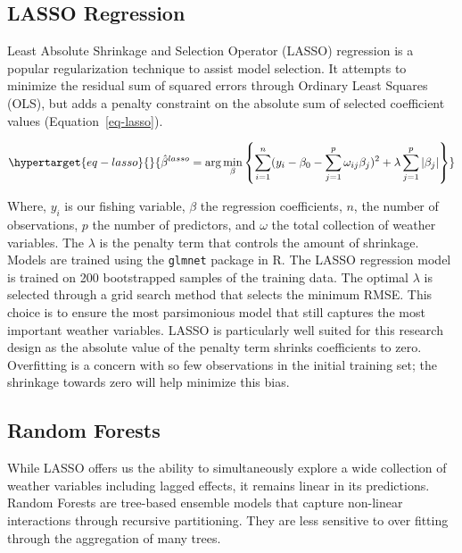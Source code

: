 \documentclass[
  letterpaper,
  DIV=11,
  numbers=noendperiod]{scrartcl}
\begin{document}
\hypertarget{lasso-regression}{%
\subsection{LASSO Regression}\label{lasso-regression}}

Least Absolute Shrinkage and Selection Operator (LASSO) regression is a
popular regularization technique to assist model selection. It attempts
to minimize the residual sum of squared errors through Ordinary Least
Squares (OLS), but adds a penalty constraint on the absolute sum of
selected coefficient values (Equation~\ref{eq-lasso}).

\begin{equation}\protect\hypertarget{eq-lasso}{}{
\hat{\beta}^{lasso}=\arg\min_{\beta}\left\{\sum_{i=1}^{n}(y_i-\beta_0-\sum_{j=1}^{p}\omega_{ij}\beta_j)^2+\lambda\sum_{j=1}^{p}|\beta_j|\right\}
}\label{eq-lasso}\end{equation}

Where, \(y_i\) is our fishing variable, \(\beta\) the regression
coefficients, \(n\), the number of observations, \(p\) the number of
predictors, and \(\omega\) the total collection of weather variables.
The \(\lambda\) is the penalty term that controls the amount of
shrinkage. Models are trained using the \texttt{glmnet} package in R.
The LASSO regression model is trained on 200 bootstrapped samples of the
training data. The optimal \(\lambda\) is selected through a grid search
method that selects the minimum RMSE. This choice is to ensure the most
parsimonious model that still captures the most important weather
variables. LASSO is particularly well suited for this research design as
the absolute value of the penalty term shrinks coefficients to zero.
Overfitting is a concern with so few observations in the initial
training set; the shrinkage towards zero will help minimize this bias.

\hypertarget{random-forests}{%
\subsection{Random Forests}\label{random-forests}}

While LASSO offers us the ability to simultaneously explore a wide
collection of weather variables including lagged effects, it remains
linear in its predictions. Random Forests are tree-based ensemble models
that capture non-linear interactions through recursive partitioning.
They are less sensitive to over fitting through the aggregation of many
trees.
\end{document}
